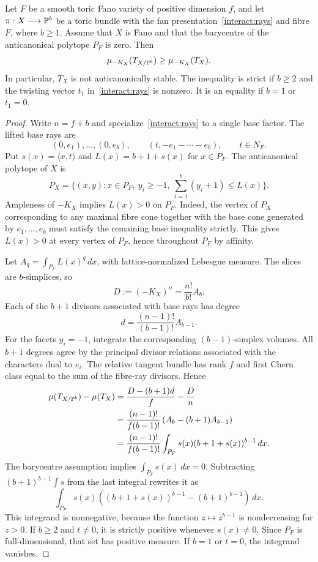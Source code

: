 \begin{proposition}\label{interact:obstruction}
Let $F$ be a smooth toric Fano variety of positive dimension $f$, and let
$\pi:X\longrightarrow\mathbb{P}^b$ be a toric bundle with the fan presentation~\eqref{interact:rays} and
fibre $F$, where $b\ge1$. Assume that $X$ is Fano and that the barycentre
of the anticanonical polytope $P_F$ is zero. Then
\[
 \mu_{-K_X}(T_{X/\mathbb{P}^b})\ge\mu_{-K_X}(T_X).
\]
In particular, $T_X$ is not anticanonically stable. The inequality is
strict if $b\ge2$ and the twisting vector $t_1$ in~\eqref{interact:rays}
is nonzero. It is an equality if $b=1$ or $t_1=0$.
\end{proposition}
\begin{proof}
Write $n=f+b$ and specialize~\eqref{interact:rays} to a single base
factor. The lifted base rays are
\[
 (0,e_1),\ldots,(0,e_b),\qquad
 (t,-e_1-\cdots-e_b),\qquad t\in N_F.
\]
Put $s(x)=\langle x,t\rangle$ and $L(x)=b+1+s(x)$ for $x\in P_F$.
The anticanonical polytope of $X$ is
\[
 P_X=\{(x,y):x\in P_F,\ y_i\ge-1,
                   \ \sum_{i=1}^b(y_i+1)\le L(x)\}.
\]
Ampleness of $-K_X$ implies $L(x)>0$ on $P_F$. Indeed, the vertex of
$P_X$ corresponding to any maximal fibre cone together with the base
cone generated by $e_1,\ldots,e_b$ must satisfy the remaining base
inequality strictly. This gives $L(x)>0$ at every vertex of $P_F$, hence
throughout $P_F$ by affinity.

Let $A_q=\int_{P_F}L(x)^q\,dx$, with lattice-normalized Lebesgue measure.
The slices are $b$-simplices, so
\[
 D:=(-K_X)^n=\frac{n!}{b!}A_b.
\]
Each of the $b+1$ divisors associated with base rays has degree
\[
 d=\frac{(n-1)!}{(b-1)!}A_{b-1}.
\]
For the facets $y_i=-1$, integrate the corresponding
$(b-1)$-simplex volumes. All $b+1$ degrees agree by the principal
divisor relations associated with the characters dual to $e_i$.
The relative tangent bundle has rank $f$ and first Chern class equal
to the sum of the fibre-ray divisors. Hence
\begin{align*}
 \mu(T_{X/\mathbb{P}^b})-\mu(T_X)
 &=\frac{D-(b+1)d}{f}-\frac{D}{n}\\
 &=\frac{(n-1)!}{f(b-1)!}
   \left(A_b-(b+1)A_{b-1}\right)\\
 &=\frac{(n-1)!}{f(b-1)!}
   \int_{P_F}s(x)(b+1+s(x))^{b-1}\,dx.
\end{align*}
The barycentre assumption implies $\int_{P_F}s(x)\,dx=0$. Subtracting
$(b+1)^{b-1}\int s$ from the last integral rewrites it as
\[
 \int_{P_F}s(x)
 \left((b+1+s(x))^{b-1}-(b+1)^{b-1}\right)\,dx.
\]
This integrand is nonnegative, because the function $z\mapsto z^{b-1}$
is nondecreasing for $z>0$. If $b\ge2$ and $t\ne0$, it is strictly
positive whenever $s(x)\ne0$. Since $P_F$ is full-dimensional, that set
has positive measure. If $b=1$ or $t=0$, the integrand vanishes.
\end{proof}

